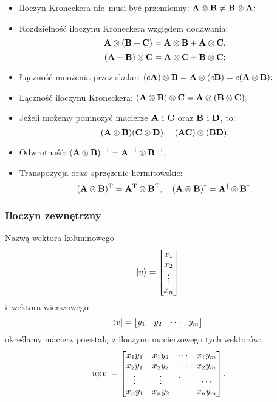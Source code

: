 \begin{itemize}
	\item Iloczyn Kroneckera nie~musi być przemienny: $\mathbf{A}\otimes \mathbf{B}\neq \mathbf{B} \otimes \mathbf{A};$
	\item Rozdzielność iloczynu Kroneckera względem dodawania:
	      $$
		      \mathbf{A} \otimes (\mathbf{B}+\mathbf{C}) = \mathbf{A} \otimes \mathbf{B} + \mathbf{A} \otimes \mathbf{C},
	      $$
	      $$
		      (\mathbf{A}+\mathbf{B})\otimes \mathbf{C} = \mathbf{A} \otimes \mathbf{C} + \mathbf{B} \otimes \mathbf{C};
	      $$
	\item Łączność mnożenia przez skalar:
	      $
		      (c\mathbf{A}) \otimes \mathbf{B} = \mathbf{A} \otimes (c\mathbf{B}) = c(\mathbf{A} \otimes \mathbf{B});
	      $
	\item Łączność iloczynu Kroneckera:
	      $
		      (\mathbf{A} \otimes \mathbf{B}) \otimes \mathbf{C} = \mathbf{A} \otimes (\mathbf{B} \otimes \mathbf{C});
	      $
	\item Jeżeli możemy pomnożyć macierze $\mathbf{A}$ i $\mathbf{C}$ oraz $\mathbf{B}$ i $\mathbf{D}$, to:
	      $$
		      (\mathbf{A} \otimes \mathbf{B})(\mathbf{C} \otimes \mathbf{D}) = (\mathbf{AC}) \otimes (\mathbf{BD});
	      $$
	\item Odwrotność:
	      $
		      (\mathbf{A} \otimes \mathbf{B})^{-1} = \mathbf{A}^{-1} \otimes \mathbf{B}^{-1};
	      $
	\item Transpozycja oraz~sprzężenie hermitowskie:
	      $$
		      (\mathbf{A}\otimes \mathbf{B})^\mathrm{T} = \mathbf{A}^\mathrm{T} \otimes \mathbf{B}^\mathrm{T}, \quad
		      (\mathbf{A}\otimes \mathbf{B})^\dagger = \mathbf{A}^\dagger \otimes \mathbf{B}^\dagger.
	      $$
\end{itemize}

\subsubsection{Iloczyn zewnętrzny}
Nazwą  wektora kolumnowego
$$
	\ket{u}=
	\begin{bmatrix}
		x_1    \\
		x_2    \\
		\vdots \\
		x_{n}  \\
	\end{bmatrix}
$$ i~wektora wierszowego
$$
	\bra{v}=
	\begin{bmatrix}
		y_1    &
		y_2    &
		\cdots &
		y_{m}
	\end{bmatrix}
$$
określamy macierz powstałą z iloczynu macierzowego tych wektorów:
$$
	\ketbra{u}{v}
	=\begin{bmatrix}
		x_1 y_1 & x_1 y_2 & \cdots & x_1 y_m \\
		x_2 y_1 & x_2 y_2 & \cdots & x_2 y_m \\
		\vdots  & \vdots  & \ddots & \cdots  \\
		x_n y_1 & x_n y_2 & \cdots & x_n y_m
	\end{bmatrix}.
$$

